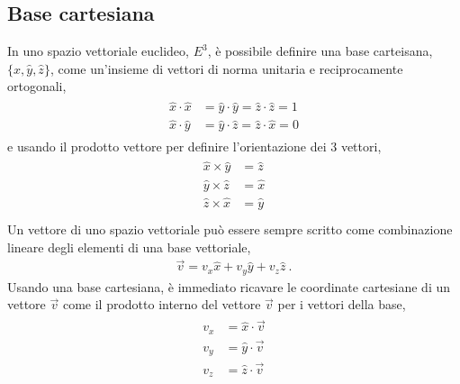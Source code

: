 \documentclass[letterpaper,10pt,italian]{jupyterBook}
\begin{document}
\subsection{Base cartesiana}
\label{\detokenize{ch/algebra/vector-algebra-euclidean-space:base-cartesiana}}
\sphinxAtStartPar
In uno spazio vettoriale euclideo, \(E^3\), è possibile definire una base carteisana, \(\{ \hat{x}, \hat{y}, \hat{z} \}\), come un’insieme di vettori di norma unitaria e reciprocamente ortogonali,
\begin{equation*}
\begin{split}\begin{aligned}
  \hat{x} \cdot  \hat{x} & = \hat{y} \cdot  \hat{y} = \hat{z} \cdot  \hat{z} = 1 \\
  \hat{x} \cdot  \hat{y} & = \hat{y} \cdot  \hat{z} = \hat{z} \cdot  \hat{x} = 0
\end{aligned}\end{split}
\end{equation*}
\sphinxAtStartPar
e usando il prodotto vettore per definire l’orientazione dei 3 vettori,
\begin{equation*}
\begin{split}\begin{aligned}
  \hat{x} \times \hat{y} & = \hat{z} \\
  \hat{y} \times \hat{z} & = \hat{x} \\
  \hat{z} \times \hat{x} & = \hat{y} \\
\end{aligned}\end{split}
\end{equation*}
\sphinxAtStartPar
Un vettore di uno spazio vettoriale può essere sempre scritto come combinazione lineare degli elementi di una base vettoriale,
\begin{equation*}
\begin{split}\vec{v} = v_x \hat{x} + v_y \hat{y} + v_z \hat{z} \ .\end{split}
\end{equation*}
\sphinxAtStartPar
Usando una base cartesiana, è immediato ricavare le coordinate cartesiane di un vettore \(\vec{v}\) come il prodotto interno del vettore \(\vec{v}\) per i vettori della base,
\begin{equation*}
\begin{split}\begin{aligned}
  v_x & = \hat{x} \cdot \vec{v} \\
  v_y & = \hat{y} \cdot \vec{v} \\
  v_z & = \hat{z} \cdot \vec{v} \\
\end{aligned}\end{split}
\end{equation*}
\end{document}
